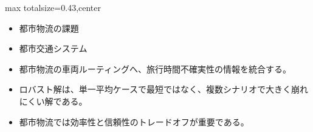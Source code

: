 \clearpage
{}
\begin{minipage}[t]{0.405\textwidth}
\begin{adjustbox}{max totalsize={\textwidth}{0.43\textheight},center}
\begin{minipage}{\textwidth}\scriptsize
{}\begin{itemize}
\item 都市物流の課題
\item 都市交通システム
\item 都市物流の車両ルーティングへ、旅行時間不確実性の情報を統合する。
\end{itemize}\begin{itemize}
\item ロバスト解は、単一平均ケースで最短ではなく、複数シナリオで大きく崩れにくい解である。
\item 都市物流では効率性と信頼性のトレードオフが重要である。
\end{itemize}
\end{minipage}
\end{adjustbox}
\end{minipage}\hfill
